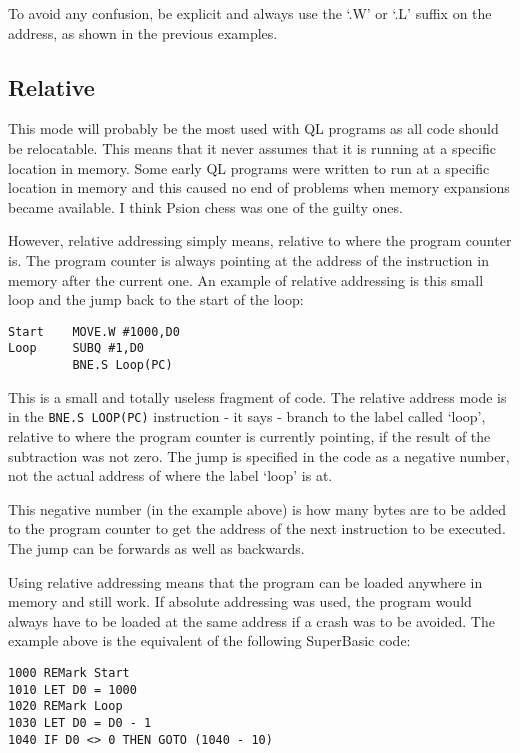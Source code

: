 To avoid any confusion, be explicit and always use the `.W' or `.L' suffix on the address, as shown 
      in the previous examples.

\subsection{Relative}\address{Relative}

This mode will probably be the most used with QL programs as all
      code should be relocatable. This means that it never assumes that it is
      running at a specific location in memory. Some early QL programs were
      written to run at a specific location in memory and this caused no end
      of problems when memory expansions became available. I think Psion chess
      was one of the guilty ones.

However, relative addressing simply means, relative to where the
      program counter is. The program counter is always pointing at the
      address of the instruction in memory after the current one. An example
      of relative addressing is this small loop and the jump back to the start
      of the loop:

\begin{lstlisting}[firstnumber=1,]
Start    MOVE.W #1000,D0
Loop     SUBQ #1,D0
         BNE.S Loop(PC)  
\end{lstlisting}

This is a small and totally useless fragment of code. The relative
      address mode is in the \lstinline{BNE.S LOOP(PC)} instruction -{} it says -{} branch to
      the label called `loop', relative to where the program counter is
      currently pointing, if the result of the subtraction was not zero. The
      jump is specified in the code as a negative number, not the actual
      address of where the label `loop' is at.

This negative number (in the example above) is how many bytes are
      to be added to the program counter to get the address of the next
      instruction to be executed. The jump can be forwards as well as
      backwards.

Using relative addressing means that the program can be loaded
      anywhere in memory and still work. If absolute addressing was used, the
      program would always have to be loaded at the same address if a crash
      was to be avoided. The example above is the equivalent of the following
      SuperBasic code:

\begin{lstlisting}[firstnumber=1,language={[Visual]Basic}]
1000 REMark Start
1010 LET D0 = 1000
1020 REMark Loop
1030 LET D0 = D0 - 1
1040 IF D0 <> 0 THEN GOTO (1040 - 10)
\end{lstlisting}

